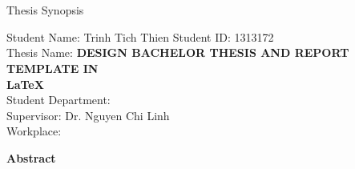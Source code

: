 \documentclass{vlththesis}
\newlength{\mylengthnew}
\begin{document}
\pagestyle{empty}
\begin{center}
\large
\theUniversity\\
\theFaculty\\
\bfseries
\theDepartment
\end{center}
\begin{center}
\Large
Thesis Synopsis
\end{center}
\begin{flushleft}
Student Name: Trinh Tich Thien \hspace{2in} Student ID: 1313172\\
Thesis Name: \textbf{DESIGN BACHELOR THESIS AND REPORT TEMPLATE IN\\ \hspace{\mylengthnew}LaTeX}\\
Student Department: \theDepartment\\
Supervisor: Dr. Nguyen Chi Linh\\
Workplace: \theUniversity
\end{flushleft}
\begin{center}
\textbf{\large Abstract}
\end{center}
\end{document}
